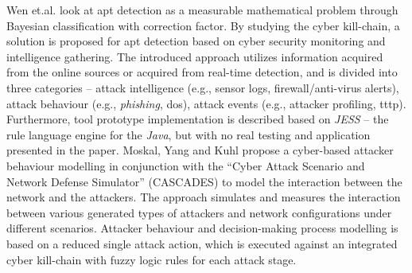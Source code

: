 Wen et.al. \cite{Wen2017} \cite{Wen2018} look at \gls{apt} detection as a measurable mathematical problem through Bayesian classification with correction factor. By studying the cyber kill-chain, a solution is proposed for \gls{apt} detection based on cyber security monitoring and intelligence gathering. The introduced approach utilizes information acquired from the online sources or acquired from real-time detection, and is divided into three categories -- attack intelligence (e.g., sensor logs, firewall/anti-virus alerts), attack behaviour (e.g., \textit{phishing}, \gls{dos}), attack events (e.g., attacker profiling, \gls{tttp}). Furthermore, tool prototype implementation is described based on \textit{JESS} -- the rule language engine for the \textit{Java}, but with no real testing and application presented in the paper.
Moskal, Yang and Kuhl \cite{Moskal2017} propose a cyber-based attacker behaviour modelling in conjunction with the ``Cyber Attack Scenario and Network Defense Simulator'' (CASCADES) to model the interaction between the network and the attackers. The approach simulates and measures the interaction between various generated types of attackers and network configurations under different scenarios. Attacker behaviour and decision-making process modelling is based on a reduced single attack action, which is executed against an integrated cyber kill-chain with fuzzy logic rules for each attack stage.
